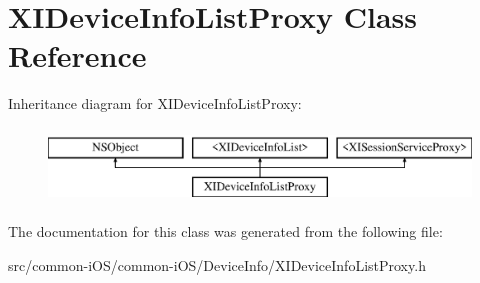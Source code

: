 \hypertarget{interface_x_i_device_info_list_proxy}{}\section{X\+I\+Device\+Info\+List\+Proxy Class Reference}
\label{interface_x_i_device_info_list_proxy}
Inheritance diagram for X\+I\+Device\+Info\+List\+Proxy\+:\begin{figure}[H]
\begin{center}
\leavevmode
\includegraphics[height=2.000000cm]{interface_x_i_device_info_list_proxy}
\end{center}
\end{figure}


The documentation for this class was generated from the following file\+:\begin{DoxyCompactItemize}
\item 
src/common-\/i\+O\+S/common-\/i\+O\+S/\+Device\+Info/X\+I\+Device\+Info\+List\+Proxy.\+h\end{DoxyCompactItemize}
